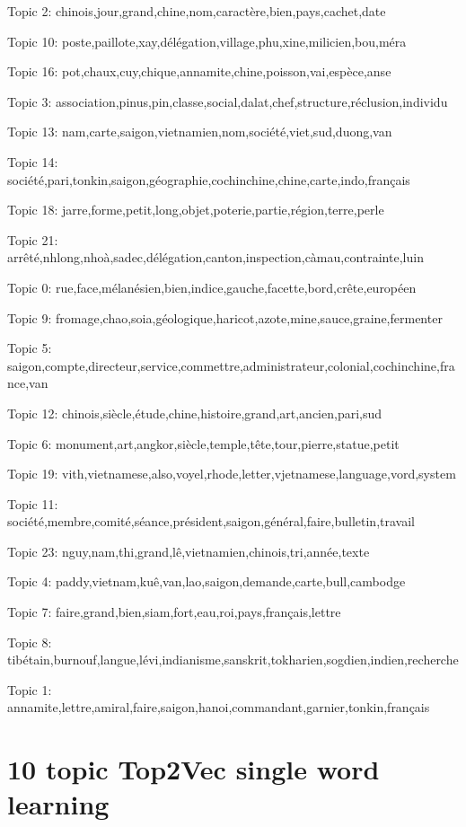 Topic 2: chinois,jour,grand,chine,nom,caractère,bien,pays,cachet,date

Topic 10: poste,paillote,xay,délégation,village,phu,xine,milicien,bou,méra

Topic 16: pot,chaux,cuy,chique,annamite,chine,poisson,vai,espèce,anse

Topic 3: association,pinus,pin,classe,social,dalat,chef,structure,réclusion,individu

Topic 13: nam,carte,saigon,vietnamien,nom,société,viet,sud,duong,van

Topic 14: société,pari,tonkin,saigon,géographie,cochinchine,chine,carte,indo,français

Topic 18: jarre,forme,petit,long,objet,poterie,partie,région,terre,perle

Topic 21: arrêté,nhlong,nhoà,sadec,délégation,canton,inspection,càmau,contrainte,luin

Topic 0: rue,face,mélanésien,bien,indice,gauche,facette,bord,crête,européen

Topic 9: fromage,chao,soia,géologique,haricot,azote,mine,sauce,graine,fermenter

Topic 5: saigon,compte,directeur,service,commettre,administrateur,colonial,cochinchine,france,van

Topic 12: chinois,siècle,étude,chine,histoire,grand,art,ancien,pari,sud

Topic 6: monument,art,angkor,siècle,temple,tête,tour,pierre,statue,petit

Topic 19: vith,vietnamese,also,voyel,rhode,letter,vjetnamese,language,vord,system

Topic 11: société,membre,comité,séance,président,saigon,général,faire,bulletin,travail

Topic 23: nguy,nam,thi,grand,lê,vietnamien,chinois,tri,année,texte

Topic 4: paddy,vietnam,kuê,van,lao,saigon,demande,carte,bull,cambodge

Topic 7: faire,grand,bien,siam,fort,eau,roi,pays,français,lettre

Topic 8: tibétain,burnouf,langue,lévi,indianisme,sanskrit,tokharien,sogdien,indien,recherche


Topic 1: annamite,lettre,amiral,faire,saigon,hanoi,commandant,garnier,tonkin,français


\newpage

\newpage
\section{10 topic Top2Vec single word learning}

